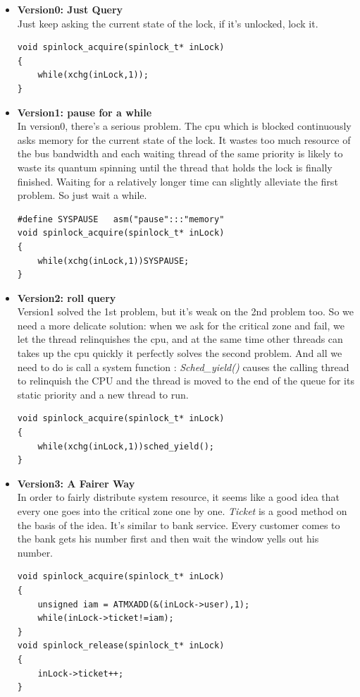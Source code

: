 \documentclass{article}
\begin{document}
		\begin{itemize}
			\item \textbf{Version0: Just Query}\\
			Just keep asking the current state of the lock, if it's unlocked, lock it.
			\begin{lstlisting}
void spinlock_acquire(spinlock_t* inLock)
{
	while(xchg(inLock,1));
}
			\end{lstlisting}
			
			\item \textbf{Version1: pause for a while}\\
			In version0, there's a serious problem. The cpu which is blocked continuously asks memory for the current state of the lock. It wastes too much resource of the bus bandwidth and each waiting thread of the same priority is likely to waste its quantum spinning until the thread that holds the lock is finally finished. Waiting for a relatively longer time can slightly alleviate the first problem. So just wait a while.
			\begin{lstlisting}
#define SYSPAUSE   asm("pause":::"memory"
void spinlock_acquire(spinlock_t* inLock)
{
	while(xchg(inLock,1))SYSPAUSE;
}
			\end{lstlisting}
			
			\item \textbf{Version2: roll query}\\
			Version1 solved the 1st problem, but it's weak on the 2nd problem too. So we need a more delicate solution: when we ask for the critical zone and fail, we let the thread relinquishes the cpu, and at the same time other threads can takes up the cpu quickly it perfectly solves the second problem. And all we need to do is call a system function : \emph{Sched\_yield()} causes the calling thread to relinquish the CPU and the thread is moved to the end of the queue for its static priority and a new thread to run.
			\begin{lstlisting}
void spinlock_acquire(spinlock_t* inLock)
{
	while(xchg(inLock,1))sched_yield();
}
			\end{lstlisting}
			
			\item \textbf{Version3: A Fairer Way}\\
			In order to fairly distribute system resource, it seems like a good idea that every one goes into the critical zone one by one. \emph{Ticket} is a good method on the basis of the idea. It's similar to bank service. Every customer comes to the bank gets his number first and then wait the window yells out his number.
			\begin{lstlisting}
void spinlock_acquire(spinlock_t* inLock)
{
	unsigned iam = ATMXADD(&(inLock->user),1);
	while(inLock->ticket!=iam);
}
void spinlock_release(spinlock_t* inLock)
{
	inLock->ticket++;
}
			\end{lstlisting}
		\end{itemize}
\end{document}
